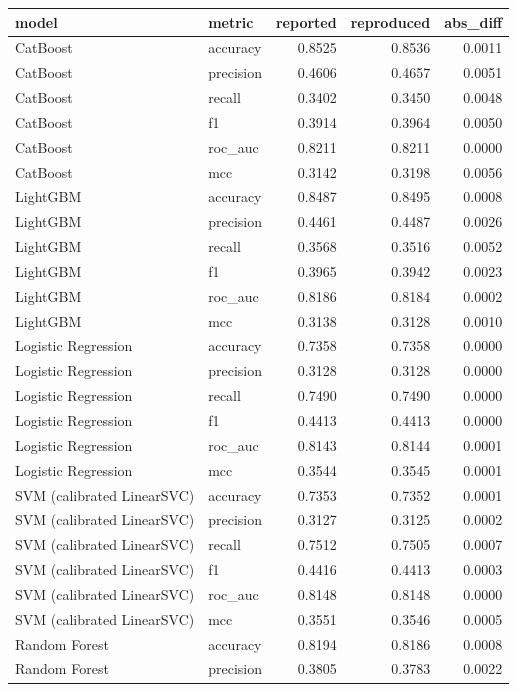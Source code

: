 \begin{tabular}{llrrr}
\toprule
model & metric & reported & reproduced & abs\_diff \\
\midrule
CatBoost & accuracy & 0.8525 & 0.8536 & 0.0011 \\
CatBoost & precision & 0.4606 & 0.4657 & 0.0051 \\
CatBoost & recall & 0.3402 & 0.3450 & 0.0048 \\
CatBoost & f1 & 0.3914 & 0.3964 & 0.0050 \\
CatBoost & roc\_auc & 0.8211 & 0.8211 & 0.0000 \\
CatBoost & mcc & 0.3142 & 0.3198 & 0.0056 \\
LightGBM & accuracy & 0.8487 & 0.8495 & 0.0008 \\
LightGBM & precision & 0.4461 & 0.4487 & 0.0026 \\
LightGBM & recall & 0.3568 & 0.3516 & 0.0052 \\
LightGBM & f1 & 0.3965 & 0.3942 & 0.0023 \\
LightGBM & roc\_auc & 0.8186 & 0.8184 & 0.0002 \\
LightGBM & mcc & 0.3138 & 0.3128 & 0.0010 \\
Logistic Regression & accuracy & 0.7358 & 0.7358 & 0.0000 \\
Logistic Regression & precision & 0.3128 & 0.3128 & 0.0000 \\
Logistic Regression & recall & 0.7490 & 0.7490 & 0.0000 \\
Logistic Regression & f1 & 0.4413 & 0.4413 & 0.0000 \\
Logistic Regression & roc\_auc & 0.8143 & 0.8144 & 0.0001 \\
Logistic Regression & mcc & 0.3544 & 0.3545 & 0.0001 \\
SVM (calibrated LinearSVC) & accuracy & 0.7353 & 0.7352 & 0.0001 \\
SVM (calibrated LinearSVC) & precision & 0.3127 & 0.3125 & 0.0002 \\
SVM (calibrated LinearSVC) & recall & 0.7512 & 0.7505 & 0.0007 \\
SVM (calibrated LinearSVC) & f1 & 0.4416 & 0.4413 & 0.0003 \\
SVM (calibrated LinearSVC) & roc\_auc & 0.8148 & 0.8148 & 0.0000 \\
SVM (calibrated LinearSVC) & mcc & 0.3551 & 0.3546 & 0.0005 \\
Random Forest & accuracy & 0.8194 & 0.8186 & 0.0008 \\
Random Forest & precision & 0.3805 & 0.3783 & 0.0022 \\

\end{tabular}
